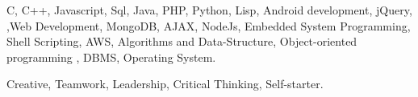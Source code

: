 



\begin{cventries}

\cvproject
{
    \begin{cvitems} %
        \item {C, C++, Javascript, Sql, Java, PHP, Python, Lisp, Android development, jQuery, ,Web Development, MongoDB, AJAX, NodeJs, Embedded System Programming, Shell Scripting, AWS, Algorithms and Data-Structure, Object-oriented programming , DBMS, Operating System.}
        \item { Creative, Teamwork, Leadership, Critical Thinking, Self-starter.}
        \end{cvitems}
}

\end{cventries}